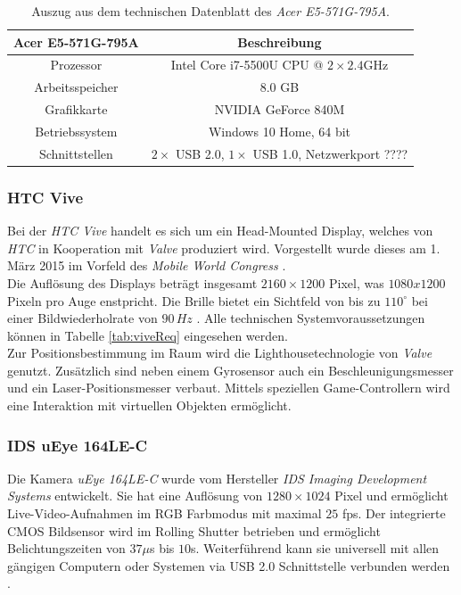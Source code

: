 \begin{table}
	\centering
	\begin{tabular}{|c|c|}
		\hline
		\Absatzbox{}
		\textbf{Acer E5-571G-795A}& \textbf{Beschreibung} \\
		\hline
		Prozessor & Intel Core i7-5500U CPU @ $2\times 2.4$GHz  \\
		\hline
		Arbeitsspeicher & $8.0$ GB \\
		\hline 
		Grafikkarte & NVIDIA GeForce 840M\\
		\hline
		Betriebssystem & Windows 10 Home, 64 bit \\
		\hline
		Schnittstellen & $2\times$ USB 2.0, $1\times$ USB 1.0, Netzwerkport ????\\
		\hline
	\end{tabular}
	\caption{Auszug aus dem technischen Datenblatt des \textit{Acer E5-571G-795A}.}
	\label{tab:TrackingCompParam}
\end{table}


\subsubsection{HTC Vive}\label{sec:Vive} 
Bei der \textit{HTC Vive} handelt es sich um ein Head-Mounted Display, welches von \textit{HTC} in Kooperation mit \textit{Valve} \cite{website:Valve} produziert wird. Vorgestellt wurde dieses am 1. März 2015 im Vorfeld des \textit{Mobile World Congress} \cite{website:mobileworldcongress}.\\
Die Auflösung des Displays beträgt insgesamt $2160\times1200$ Pixel, was $1080x1200$ Pixeln pro Auge enstpricht. Die Brille bietet ein Sichtfeld von bis zu $110^\circ$ bei einer Bildwiederholrate von $90\,Hz$ \cite{website:HTC_Vive}. Alle technischen Systemvoraussetzungen können in Tabelle \ref{tab:viveReq} eingesehen werden. \\
Zur Positionsbestimmung im Raum wird die Lighthousetechnologie von \textit{Valve} genutzt. Zusätzlich sind neben einem Gyrosensor auch ein Beschleunigungsmesser und ein Laser-Positionsmesser verbaut. Mittels speziellen Game-Controllern wird eine Interaktion mit virtuellen Objekten ermöglicht.

\subsubsection{IDS uEye 164LE-C}\label{sec:uEye} 
Die Kamera \textit{uEye 164LE-C} wurde vom Hersteller \textit{IDS Imaging Development Systems} entwickelt. Sie hat eine Auflösung von $1280 \times 1024$ Pixel und ermöglicht Live-Video-Aufnahmen im RGB Farbmodus mit maximal $25$ fps. Der integrierte CMOS Bildsensor wird im Rolling Shutter betrieben und ermöglicht Belichtungszeiten von $37\mu$s bis $10$s. Weiterführend kann sie universell mit allen gängigen Computern oder Systemen via USB 2.0 Schnittstelle verbunden werden \cite{website:UEyeTechSpec}.\\

